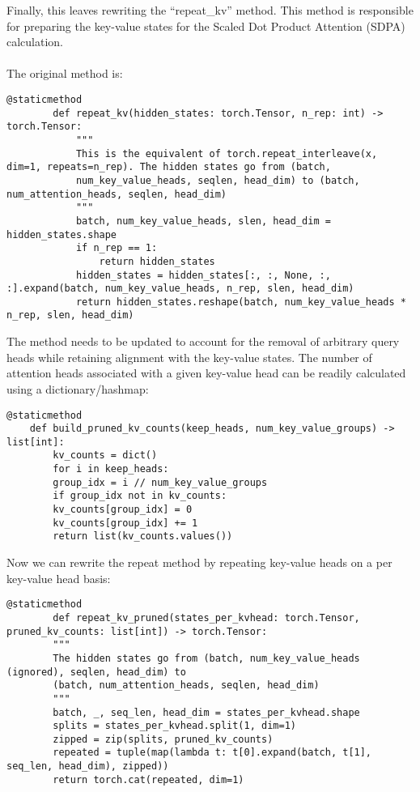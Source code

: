 \documentclass{article}
\begin{document}
    Finally, this leaves rewriting the ``repeat\_kv'' method.
    This method is responsible for preparing the key-value states for the Scaled Dot Product Attention (SDPA) calculation.
    \\ \\
    The original method is:
    \begin{lstlisting}[label={lst:original repeat_kv}]
        @staticmethod
        def repeat_kv(hidden_states: torch.Tensor, n_rep: int) -> torch.Tensor:
            """
            This is the equivalent of torch.repeat_interleave(x, dim=1, repeats=n_rep). The hidden states go from (batch,
            num_key_value_heads, seqlen, head_dim) to (batch, num_attention_heads, seqlen, head_dim)
            """
            batch, num_key_value_heads, slen, head_dim = hidden_states.shape
            if n_rep == 1:
                return hidden_states
            hidden_states = hidden_states[:, :, None, :, :].expand(batch, num_key_value_heads, n_rep, slen, head_dim)
            return hidden_states.reshape(batch, num_key_value_heads * n_rep, slen, head_dim)
    \end{lstlisting}

    The method needs to be updated to account for the removal of arbitrary query heads while retaining alignment with the key-value states.
    The number of attention heads associated with a given key-value head can be readily calculated using a dictionary/hashmap:

    \begin{lstlisting}[label={lst:Calculating query heads per key-value head}]
    @staticmethod
    def build_pruned_kv_counts(keep_heads, num_key_value_groups) -> list[int]:
        kv_counts = dict()
        for i in keep_heads:
        group_idx = i // num_key_value_groups
        if group_idx not in kv_counts:
        kv_counts[group_idx] = 0
        kv_counts[group_idx] += 1
        return list(kv_counts.values())
    \end{lstlisting}

    Now we can rewrite the repeat method by repeating key-value heads on a per key-value head basis:

    \begin{lstlisting}[label={lst:intail_repeat_pruned}]
        @staticmethod
        def repeat_kv_pruned(states_per_kvhead: torch.Tensor, pruned_kv_counts: list[int]) -> torch.Tensor:
        """
        The hidden states go from (batch, num_key_value_heads (ignored), seqlen, head_dim) to
        (batch, num_attention_heads, seqlen, head_dim)
        """
        batch, _, seq_len, head_dim = states_per_kvhead.shape
        splits = states_per_kvhead.split(1, dim=1)
        zipped = zip(splits, pruned_kv_counts)
        repeated = tuple(map(lambda t: t[0].expand(batch, t[1], seq_len, head_dim), zipped))
        return torch.cat(repeated, dim=1)
    \end{lstlisting}
\end{document}

